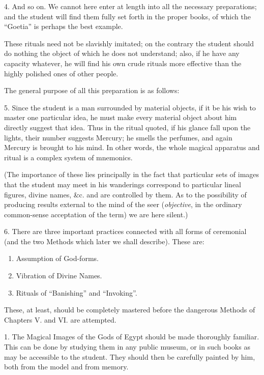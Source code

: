 4. And so on. We cannot here enter at length into all the necessary preparations; and the student will find them fully set forth in the proper books, of which the \enquote{Goetia} is perhaps the best example.

These rituals need not be slavishly imitated; on the contrary the student should do nothing the object of which he does not understand; also, if he have any capacity whatever, he will find his own crude rituals more effective than the highly polished ones of other people.


The general purpose of all this preparation is as follows:


5. Since the student is a man surrounded by material objects, if it be his wish to master one particular idea, he must make every material object about him directly suggest that idea. Thus in the ritual quoted, if his glance fall upon the lights, their number suggests Mercury; he smells the perfumes, and again Mercury is brought to his mind. In other words, the whole magical apparatus and ritual is a complex system of mnemonics.

(The importance of these lies principally in the fact that particular sets of images that the student may meet in his wanderings correspond to particular lineal figures, divine names, \&c. and are controlled by them. As to the possibility of producing results external to the mind of the seer (\textit{objective}, in the ordinary common-sense acceptation of the term) we are here silent.)

6. There are three important practices connected with all forms of ceremonial (and the two Methods which later we shall describe). These are:

\begin{enumerate}[label=(\arabic*)]
\item Assumption of God-forms.
\item Vibration of Divine Names.
\item Rituals of \enquote{Banishing} and \enquote{Invoking}.
\end{enumerate}

These, at least, should be completely mastered before the dangerous Methods of Chapters V. and VI. are attempted.




1. The Magical Images of the Gods of Egypt should be made thoroughly familiar. This can be done by studying them in any public museum, or in such books as may be accessible to the student. They should then be carefully painted by him, both from the model and from memory.

